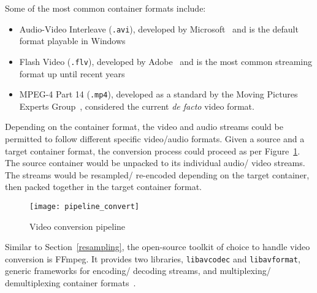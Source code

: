 Some of the most common container formats include:

\begin{itemize}
    \item Audio-Video Interleave (\texttt{.avi}), developed by
    Microsoft~\cite{avi} and is the default format playable in Windows
    \item Flash Video (\texttt{.flv}), developed by Adobe~\cite{flv} and is
    the most common streaming format up until recent years
    \item MPEG-4 Part 14 (\texttt{.mp4}), developed as a standard by the
    Moving Pictures Experts Group~\cite{mp4}, considered the current
    \textit{de facto} video format.
\end{itemize}

Depending on the container format, the video and audio streams could be permitted
to follow different specific video/audio formats. Given a source and a target
container format, the conversion process could proceed as per Figure~\ref{convert}.
The source container would be unpacked to its individual audio/ video streams.
The streams would be resampled/ re-encoded depending on the target container, then
packed together in the target container format.

\begin{figure}[ht]
\begin{center}
    \texttt{[image: pipeline\_convert]}
    \caption{Video conversion pipeline}\label{convert}
\end{center}
\end{figure}

Similar to Section~\ref{resampling}, the open-source toolkit of choice to handle
video conversion is FFmpeg. It provides two libraries, \texttt{libavcodec} and
\texttt{libavformat}, generic frameworks for encoding/ decoding streams, and
multiplexing/ demultiplexing container formats~\cite{ffmpeg-libav, ffmpeg-libfmt}.